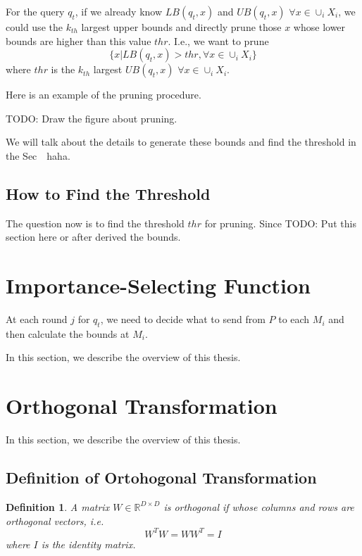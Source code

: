 For the query $q_t$, if we already know $LB(q_t,x)$ and $UB(q_t,x)$ $\forall x\in \cup_i X_i$, we could use the $k_{th}$ largest upper bounds and directly prune those $x$ whose lower bounds are higher than this value $thr$. I.e., we want to prune
\[
\{x |LB(q_t,x)>thr, \forall x \in \cup_i X_i\}
\]
where $thr$ is the $k_{th}$ largest $UB(q_t,x)$ $\forall x\in \cup_i X_i$.

Here is an example of the pruning procedure.

TODO: Draw the figure about pruning.

We will talk about the details to generate these bounds and find the threshold in the Sec~~haha.


\subsection{How to Find the Threshold} %
\label{sub:find_the_threshold}
The question now is to find the threshold $thr$ for pruning.  Since 
TODO: Put this section here or after derived the bounds.



\section{Importance-Selecting Function} %
\label{s:importance_selecting_function}
At each round $j$ for $q_t$, we need to decide what to send from $P$ to each $M_i$ and then calculate the bounds at $M_i$. 

In this section, we describe the overview of this thesis.


\section{Orthogonal Transformation}
\label{s:orthogonal}
In this section, we describe the overview of this thesis.

\subsection{Definition of Ortohogonal Transformation}
\label{ss:ortho_def}
\newtheorem{Orthogonal}{\bf Definition}
\begin{Orthogonal}
A matrix $W \in\mathbb{R}^{D\times D}$ is orthogonal if whose columns and rows are orthogonal vectors, i.e.
\[
W^{T}W=WW^{T}=I
\]
where $I$ is the identity matrix.
\end{Orthogonal}

